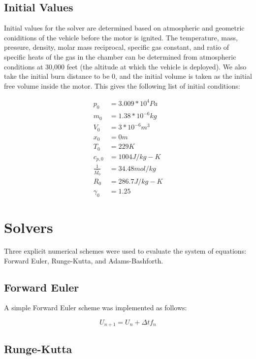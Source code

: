 \documentclass[12pt, letterpaper]{article}
\begin{document}
\subsection{Initial Values}

Initial values for the solver are determined based on atmospheric and geometric coniditions of the vehicle before the motor is ignited. The temperature, mass, pressure, density, molar mass reciprocal, specific gas constant, and ratio of specific heats of the gas in the chamber can be determined from atmospheric conditions at 30,000 feet (the altitude at which the vehicle is deployed). We also take the initial burn distance to be 0, and the initial volume is taken as the initial free volume inside the motor. This gives the following list of initial conditions:

\begin{align*}
  p_0 &= 3.009 * 10^4 Pa \\
  m_0 &= 1.38 * 10^{-6} kg \\
  V_0 &= 3 * 10^{-6} m^3 \\
  x_0 &= 0 m \\
  T_0 &= 229 K \\
  c_{p,0} &= 1004 J/kg-K \\
  \frac{1}{\bar{M_0}} &= 34.48 mol/kg \\
  R_0 &= 286.7 J/kg-K \\
  \gamma_0 &= 1.25
\end{align*}

\section{Solvers}

Three explicit numerical schemes were used to evaluate the system of equations: Forward Euler, Runge-Kutta, and Adams-Bashforth. 

\subsection{Forward Euler} 

A simple Forward Euler scheme was implemented as follows:

\begin{equation}
  U_{n + 1} = U_n + \Delta t f_n
\end{equation}

\subsection{Runge-Kutta}
\end{document}

